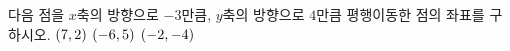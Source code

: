 다음 점을 $x$축의 방향으로 $-3$만큼, $y$축의 방향으로 $4$만큼 평행이동한 점의 좌표를 구하시오.
 $(7{,}\mkern3mu\mathopen{}2)$
 $(-6{,}\mkern3mu\mathopen{}5)$
 $(-2{,}\mkern3mu\mathopen{}-4)$

